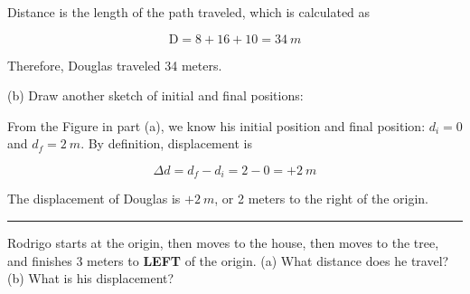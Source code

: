 \documentclass{article}
\begin{document}
Distance is the length of the path traveled, which is calculated as

\begin{equation*}
    \mathrm{D} = 8 + 16 + 10 = \SI{34}{m}
\end{equation*}

Therefore, Douglas traveled 34 meters.

\vspace{1ex}

(b) Draw another sketch of initial and final positions:

\begin{center}
\end{center}

From the Figure in part (a), we know his initial position and final position: $d_i = 0$ and $d_f = \SI{2}{m}$. By definition, displacement is

\begin{equation*}
    \Delta{d} = d_f - d_i = 2 - 0 = +\SI{2}{m}
\end{equation*}

The displacement of Douglas is $+\SI{2}{m}$, or 2 meters to the right of the origin.

\hrule

\vspace{1em}


\begin{example} \label{4Li1vK}
Rodrigo starts at the origin, then moves to the house, then moves to the tree, and finishes 3 meters to \textbf{LEFT} of the origin. (a) What distance does he travel? (b) What is his displacement?
\end{example}
\end{document}
